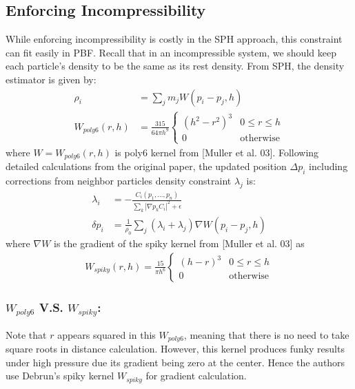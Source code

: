 \documentclass[sigconf]{acmart}
\begin{document}
\subsection{Enforcing Incompressibility}
While enforcing incompressibility is costly in the SPH approach, this constraint can fit easily in PBF. Recall that in an incompressible system, we should keep each particle’s density to be the same as its rest density. From SPH, the density estimator is given by: 
\begin{align*}
    \rho_i &=\sum_j m_jW(p_i-p_j, h)\\
    W_{poly6}(r, h) &= \frac{315}{64\pi h^9}\begin{cases}
            (h^2-r^2)^3 & 0\leq r \leq h\\
            0 & \mbox{otherwise} 
        \end{cases}
\end{align*}
where $W= W_{poly6}(r, h)$ is poly6 kernel from [Muller et al. 03].
Following detailed calculations from the original paper, the updated position $\Delta p_i$ including corrections from neighbor particles density constraint $\lambda_j$ is:
\begin{align*}
    \lambda_i &= -\frac{C_i(p_1,...,p_n)}{\sum_k |\nabla p_kC_i|^2 + \epsilon}\\
    \delta p_i &= \frac{1}{\rho_0}\sum_j(\lambda_i + \lambda_j)\nabla W(p_i - p_j, h)
\end{align*}
where $\nabla W$ is the gradient of the spiky kernel from [Muller et al. 03] as 
\begin{align*}
    W_{spiky}(r, h) = \frac{15}{\pi h^6}\begin{cases}
            (h-r)^3 & 0\leq r \leq h\\
            0 & \mbox{otherwise} 
        \end{cases}
\end{align*}
\subsubsection{$W_{poly6}$ V.S. $W_{spiky}$:}
Note that $r$ appears squared in this $W_{poly6}$, meaning that there is no need to take square roots in distance calculation. However, this kernel produces funky results under high pressure due its gradient being zero at the center. Hence the authors use Debrun’s spiky kernel $W_{spiky}$ for gradient calculation.
\end{document}
